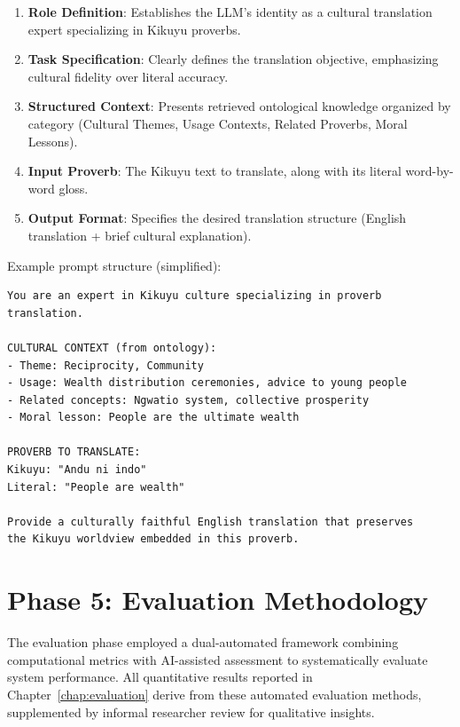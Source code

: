 \begin{enumerate}
    \item \textbf{Role Definition}: Establishes the LLM's identity as a cultural translation expert specializing in Kikuyu proverbs.
    
    \item \textbf{Task Specification}: Clearly defines the translation objective, emphasizing cultural fidelity over literal accuracy.
    
    \item \textbf{Structured Context}: Presents retrieved ontological knowledge organized by category (Cultural Themes, Usage Contexts, Related Proverbs, Moral Lessons).
    
    \item \textbf{Input Proverb}: The Kikuyu text to translate, along with its literal word-by-word gloss.
    
    \item \textbf{Output Format}: Specifies the desired translation structure (English translation + brief cultural explanation).
\end{enumerate}

Example prompt structure (simplified):

\begin{verbatim}
You are an expert in Kikuyu culture specializing in proverb translation.

CULTURAL CONTEXT (from ontology):
- Theme: Reciprocity, Community
- Usage: Wealth distribution ceremonies, advice to young people
- Related concepts: Ngwatio system, collective prosperity
- Moral lesson: People are the ultimate wealth

PROVERB TO TRANSLATE:
Kikuyu: "Andu ni indo"
Literal: "People are wealth"

Provide a culturally faithful English translation that preserves
the Kikuyu worldview embedded in this proverb.
\end{verbatim}

\section{Phase 5: Evaluation Methodology}
\label{sec:phase_evaluation}

The evaluation phase employed a dual-automated framework combining computational metrics with AI-assisted assessment to systematically evaluate system performance. All quantitative results reported in Chapter~\ref{chap:evaluation} derive from these automated evaluation methods, supplemented by informal researcher review for qualitative insights.

